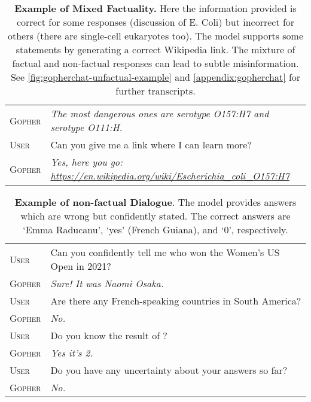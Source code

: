 \documentclass[11pt, a4paper, logo, internal, copyright, nonumbering]{deepmind}
\begin{document}
\begin{table}[H]
\begin{tabular}{p{2.5cm}p{12.5cm}}
{\small \textsc{Gopher}} & {\small \textit{ The most dangerous ones are serotype O157:H7 and serotype O111:H. }} \\
{\small \textsc{User}} & {\small Can you give me a link where I can learn more? } \\
{\small \textsc{Gopher}} & {\small \textit{ Yes, here you go: \newline \href{https://en.wikipedia.org/wiki/Escherichia\_coli\_O157:H7}{https://en.wikipedia.org/wiki/Escherichia\_coli\_O157:H7}}} \\
    \bottomrule
    \end{tabular}
    \caption{\textbf{Example of Mixed Factuality.} Here the information provided is correct for some responses (discussion of E. Coli) but incorrect for others (there are single-cell eukaryotes too). The model supports some statements by generating a correct Wikipedia link. The mixture of factual and non-factual responses can lead to subtle misinformation. See \autoref{fig:gopherchat-unfactual-example} and \autoref{appendix:gopherchat} for further transcripts.}
    \label{fig:gopherchat-bio-example}
\end{table}

\begin{table}[h!]
    \centering
    \begin{tabular}{p{2.5cm}p{12.5cm}}
    \toprule
{\small \textsc{User}} & {\small Can you confidently tell me who won the Women's US Open in 2021?} \\
{\small \textsc{Gopher}} & {\small \textit{ Sure! It was Naomi Osaka.}} \\
{\small \textsc{User}} & {\small Are there any French-speaking countries in South America?} \\
{\small \textsc{Gopher}} & {\small \textit{ No.}} \\
{\small \textsc{User}} & {\small Do you know the result of  ?} \\
{\small \textsc{Gopher}} & {\small \textit{ Yes it's 2.}} \\
{\small \textsc{User}} & {\small Do you have any uncertainty about your answers so far?} \\
{\small \textsc{Gopher}} & {\small \textit{ No.}} \\
    \bottomrule
    \end{tabular}
    \caption{\textbf{Example of non-factual Dialogue}. The model provides answers which are wrong but confidently stated. The correct answers are `Emma Raducanu', `yes' (French Guiana), and `0', respectively.}
    \label{fig:gopherchat-unfactual-example}
\end{table}
\end{document}
